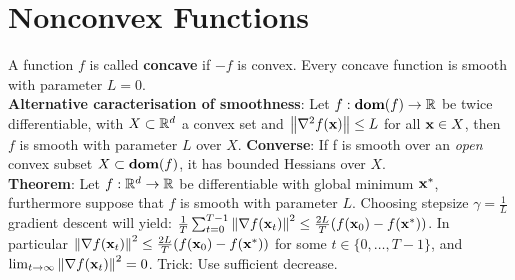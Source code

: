 \section{Nonconvex Functions}
A function $f$ is called \textbf{concave} if $-f$ is convex. Every concave function is smooth with parameter $L=0$. \\
\textbf{Alternative caracterisation of smoothness}: Let $f : \textbf{dom}(f) \rightarrow \mathbb{R}$ be twice differentiable, with $X \subset \mathbb{R}^d$ a convex set and $\norm{\nabla^2 f(\mathbf{x})} \leq L$ for all $\mathbf{x} \in X$, then $f$ is smooth with parameter $L$ over $X$. 
\textbf{Converse}: If f is smooth over an \textit{open} convex subset $X \subset \textbf{dom}(f)$, it has bounded Hessians over $X$. \\
\textbf{Theorem}: Let $f : \mathbb{R}^d \rightarrow \mathbb{R}$ be differentiable with global minimum $\mathbf{x}^*$, furthermore suppose that $f$ is smooth with parameter $L$. Choosing stepsize $\gamma = \frac{1}{L}$ gradient descent will yield: $\frac{1}{T}\sum_{t=0}^{T-1}{\norm{\nabla f(\mathbf{x}_t)}^2}\leq \frac{2L}{T}(f(\mathbf{x}_0) - f(\mathbf{x}^*))$. In particular $\norm{\nabla f(\mathbf{x}_t)}^2 \leq \frac{2L}{T}(f(\mathbf{x}_0) - f(\mathbf{x}^*))$ for some $t \in \{0, \dots, T-1\}$, and $\lim_{t \rightarrow \infty}{\norm{\nabla f(\mathbf{x}_t)}^2}=0$. Trick: Use sufficient decrease. \\
